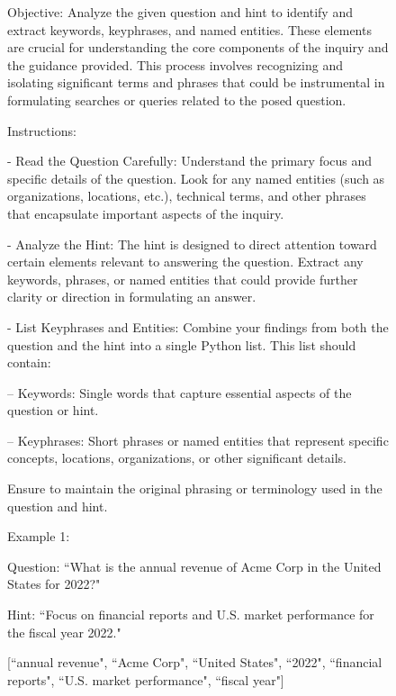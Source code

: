 \begin{figure}[h!]
    \centering
    \begin{tcolorbox}[
        title=Question Keywords Extraction Prompt,
        colback=white,        %
        colframe=blue!75!black,  %
        fonttitle=\bfseries,    %
    ]

Objective: Analyze the given question and hint to identify and extract keywords, keyphrases, and named entities. These elements are crucial for understanding the core components of the inquiry and the guidance provided. This process involves recognizing and isolating significant terms and phrases that could be instrumental in formulating searches or queries related to the posed question.
\vspace{1em}

Instructions:

- Read the Question Carefully: Understand the primary focus and specific details of the question. Look for any named entities (such as organizations, locations, etc.), technical terms, and other phrases that encapsulate important aspects of the inquiry.

- Analyze the Hint: The hint is designed to direct attention toward certain elements relevant to answering the question. Extract any keywords, phrases, or named entities that could provide further clarity or direction in formulating an answer.

- List Keyphrases and Entities: Combine your findings from both the question and the hint into a single Python list. This list should contain:

-- Keywords: Single words that capture essential aspects of the question or hint.

-- Keyphrases: Short phrases or named entities that represent specific concepts, locations, organizations, or other significant details.

\vspace{1em}
Ensure to maintain the original phrasing or terminology used in the question and hint.

\vspace{1em}
Example 1:

Question: ``What is the annual revenue of Acme Corp in the United States for 2022?"

Hint: ``Focus on financial reports and U.S. market performance for the fiscal year 2022."

[``annual revenue", ``Acme Corp", ``United States", ``2022", ``financial reports", ``U.S. market performance", ``fiscal year"]


\end{tcolorbox}
\end{figure}
